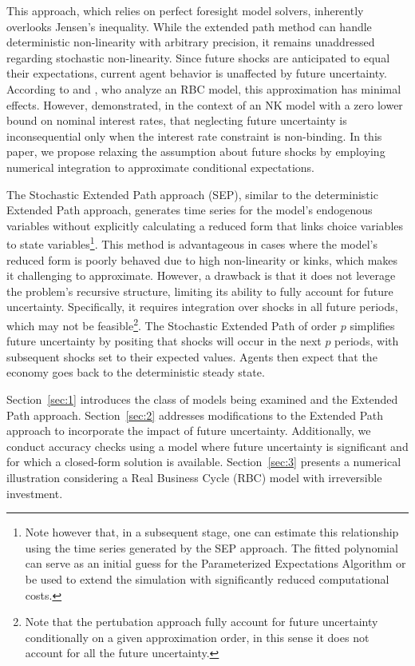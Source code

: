 \documentclass[a4paper,11pt]{amsart}
\begin{document}
This approach, which relies on perfect foresight model solvers,
inherently overlooks Jensen's inequality. While the extended path
method can handle deterministic non-linearity with arbitrary
precision, it remains unaddressed regarding stochastic
non-linearity. Since future shocks are anticipated to equal their
expectations, current agent behavior is unaffected by future
uncertainty. According to \textcite{Gagnon1990} and
\textcite{Love2009}, who analyze an RBC model, this approximation has
minimal effects. However, \textcite{AdjemianJuillard2011}
demonstrated, in the context of an NK model with a zero lower bound on
nominal interest rates, that neglecting future uncertainty is
inconsequential only when the interest rate constraint is
non-binding. In this paper, we propose relaxing the assumption about
future shocks by employing numerical integration to approximate
conditional expectations.\newline

The Stochastic Extended Path approach (SEP), similar to the
deterministic Extended Path approach, generates time series for the
model's endogenous variables without explicitly calculating a reduced
form that links choice variables to state variables\footnote{Note
   however that, in a subsequent stage, one can estimate this
   relationship using the time series generated by the SEP
   approach. The fitted polynomial can serve as an initial guess for
   the Parameterized Expectations Algorithm or be used to extend the
   simulation with significantly reduced computational costs.}. This
method is advantageous in cases where the model's reduced form is
poorly behaved due to high non-linearity or kinks, which makes it
challenging to approximate. However, a drawback is that it does not
leverage the problem's recursive structure, limiting its ability to
fully account for future uncertainty. Specifically, it requires
integration over shocks in all future periods, which may not be feasible\footnote{Note that the pertubation
   approach fully account for future uncertainty conditionally on a
   given approximation order, in this sense it does not account for all
   the future uncertainty.}.
The Stochastic Extended Path of order \( p \) simplifies future
uncertainty by positing that shocks will occur in the next \( p \)
periods, with subsequent shocks set to their expected
values.  Agents then expect that the
economy goes back to the deterministic steady state.\newline

Section~\ref{sec:1} introduces the class of models being examined and
the Extended Path approach. Section~\ref{sec:2} addresses
modifications to the Extended Path approach to incorporate the impact
of future uncertainty. Additionally, we conduct accuracy checks using
a model where future uncertainty is significant and for which a
closed-form solution is available. Section~\ref{sec:3} presents a
numerical illustration considering a Real Business Cycle (RBC) model
with irreversible investment.
\end{document}
